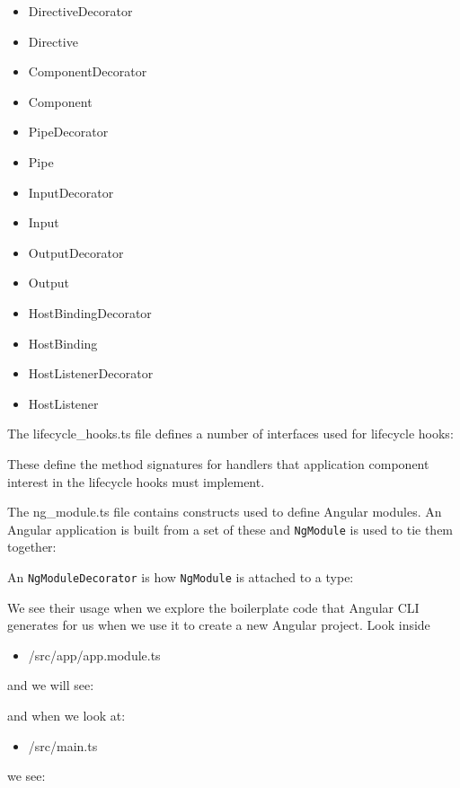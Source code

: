 \begin{itemize}
  \item DirectiveDecorator
  \item Directive
  \item ComponentDecorator
  \item Component
  \item PipeDecorator
  \item Pipe
  \item InputDecorator
  \item Input
  \item OutputDecorator
  \item Output
  \item HostBindingDecorator
  \item HostBinding
  \item HostListenerDecorator
  \item HostListener
\end{itemize}

The lifecycle\_hooks.ts file defines a number of interfaces used for lifecycle hooks:



These define the method signatures for handlers that application component interest
in the lifecycle hooks must implement.

The ng\_module.ts file contains constructs used to define Angular modules. An Angular
application is built from a set of these and
\texttt{NgModule}
is used to tie them together:



An
\texttt{NgModuleDecorator}
is how
\texttt{NgModule}
is attached to a type:



We see their usage when we explore the boilerplate code that Angular CLI generates
for us when we use it to create a new Angular project. Look inside

\begin{itemize}
  \item <my-project>/src/app/app.module.ts
\end{itemize}

and we will see:



and when we look at:

\begin{itemize}
  \item <my-project>/src/main.ts
\end{itemize}

we see:


